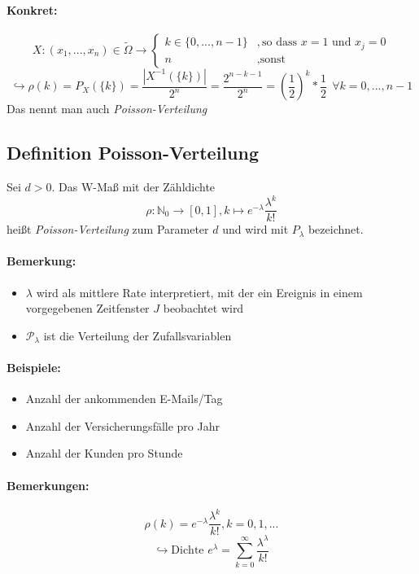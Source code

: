 \documentclass[12pt,a4paper]{article}
\begin{document}
 	\paragraph{Konkret:}
 	\[
 	X:(x_1,...,x_n)\in\tilde{\Omega}\rightarrow \left\{\begin{array}{lr}
 		k\in\{0,...,n-1\} &,\text{so dass } x=1 \text{ und } x_j=0\\
 		n &,\text{sonst} 	
 	\end{array}\right.
 	\]
 	$$\hookrightarrow\rho(k)=P_X\left(\{k\}\right)=\frac{|X^{-1}\left(\{k\}\right)|}{2^n}=
 	\frac{2^{n-k-1}}{2^n}=\left(\frac{1}{2}\right)^k *\frac{1}{2} \:\: \forall k=0,...,n-1$$
 	Das nennt man auch \textit{Poisson-Verteilung}
 	\subsection{Definition Poisson-Verteilung}
 	Sei $d>0$. Das W-Maß mit der Zähldichte 
 	$$\rho:\mathbb{N}_0\rightarrow[0,1],k \mapsto e^{-\lambda} \frac{\lambda^{k}}{k!}$$
 	heißt \textit{Poisson-Verteilung} zum Parameter $d$ und wird mit $P_{\lambda}$ bezeichnet.
 	\paragraph{Bemerkung:}
 	\begin{itemize}
 		\item $\lambda$ wird als mittlere Rate interpretiert, mit der ein Ereignis in einem vorgegebenen Zeitfenster $J$ beobachtet wird
 		\item $\mathcal{P}_{\lambda}$ ist die Verteilung der Zufallsvariablen  		
 	\end{itemize}
 	\paragraph{Beispiele:}
 	\begin{itemize}
 		\item Anzahl der ankommenden E-Mails/Tag
 		\item Anzahl der Versicherungsfälle  pro Jahr
 		\item Anzahl der Kunden pro Stunde
 	\end{itemize}
 	\paragraph{Bemerkungen:}
 	$$\rho(k)=e^{-\lambda}\frac{\lambda^k}{k!}, k=0,1,...$$
 	$$\hookrightarrow \text{Dichte   } e^{\lambda}=\sum^{\infty}_{k=0}\frac{\lambda^{\lambda}}{k!}$$
	
\end{document}
